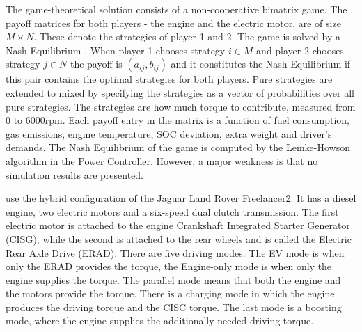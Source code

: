 The game-theoretical solution consists of a non-cooperative bimatrix game. The payoff matrices for both players - the engine and the electric motor, are of size $M \times N$. These denote the strategies of player 1 and 2. The game is solved by a Nash Equilibrium \citep{nash1951non}. When player 1 chooses strategy $i \in M$ and player 2 chooses strategy $j \in N$ the payoff is $(a_{ij},b_{ij})$ and it constitutes the Nash Equilibrium if this pair contains the optimal strategies for both players. Pure strategies are extended to mixed by specifying the strategies as a vector of probabilities over all pure strategies. The strategies are how much torque to contribute, measured from 0 to 6000rpm. Each payoff entry in the matrix is a function of fuel consumption, gas emissions, engine temperature, SOC deviation, extra weight and driver's demands. The Nash Equilibrium of the game is computed by the Lemke-Howson algorithm \citep{lemke1964equilibrium} in the Power Controller. However, a major weakness is that no simulation results are presented.


\citet{dextreit2014game} use the hybrid configuration of the Jaguar Land Rover Freelancer2. It has a diesel engine, two electric motors and a six-speed dual clutch transmission. The first electric motor is attached to the engine Crankshaft Integrated Starter Generator (CISG), while the second is attached to the rear wheels and is called the Electric Rear Axle Drive (ERAD). There are five driving modes. The EV mode is when only the ERAD provides the torque, the Engine-only mode is when only the engine supplies the torque. The parallel mode means that both the engine and the motors provide the torque. There is a charging mode in which the engine produces the driving torque and the CISC torque. The last mode is a boosting mode, where the engine supplies the additionally needed driving torque.

